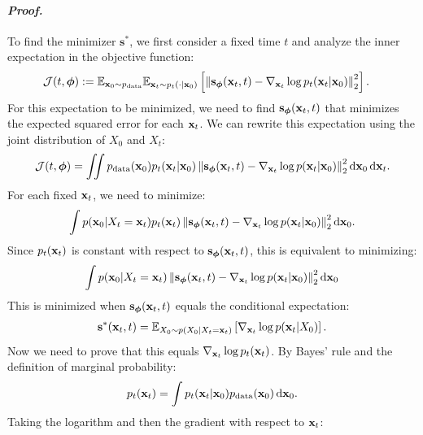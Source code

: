 \paragraph{\textit{Proof.}} To find the minimizer $\mathbf{s}^*$, we first consider a fixed time $t$ and analyze the inner expectation in the objective function:
\begin{align*}
\mathcal  J(t, \bm{\phi}) 
&:= \mathbb{E}_{{\mathbf{x}}_0 \sim p_{\text{data}}} 
\mathbb{E}_{{\mathbf{x}}_t \sim p_t(\cdot|{\mathbf{x}}_0)} 
\left[\left\| \mathbf{s}_{\bm{\phi}}({\mathbf{x}}_t, t) - \nabla_{{\mathbf{x}}_t} \log p_t({\mathbf{x}}_t|{\mathbf{x}}_0) \right\|_2^2 \right].
\end{align*}
For this expectation to be minimized, we need to find 
$\mathbf{s}_{\bm{\phi}}({\mathbf{x}}_t, t)$ 
that minimizes the expected squared error for each ${\mathbf{x}}_t$.
We can rewrite this expectation using the joint distribution of $X_0$ and $X_t$:
\begin{align*}
\mathcal J(t, \bm{\phi}) 
= \iint p_{\text{data}}({\mathbf{x}}_0) p_t({\mathbf{x}}_t |{\mathbf{x}}_0) 
\left\| \mathbf{s}_{\bm{\phi}}({\mathbf{x}}_t, t) - \nabla_{{\mathbf{x}}_t} \log p({\mathbf{x}}_t |  {\mathbf{x}}_0) \right\|_2^2 
 \mathop{}\!\mathrm{d}{\mathbf{x}}_0  \mathop{}\!\mathrm{d}{\mathbf{x}}_t.
\end{align*}
For each fixed ${\mathbf{x}}_t$, we need to minimize:
\begin{align*}
\int p({\mathbf{x}}_0 | X_t = {\mathbf{x}}_t) p_t( {\mathbf{x}}_t) 
\left\| \mathbf{s}_{\bm{\phi}}({\mathbf{x}}_t, t) - \nabla_{{\mathbf{x}}_t} \log p({\mathbf{x}}_t |  {\mathbf{x}}_0) \right\|_2^2 
 \mathop{}\!\mathrm{d}{\mathbf{x}}_0.
\end{align*}
Since $p_t({\mathbf{x}}_t)$ is constant with respect to 
$\mathbf{s}_{\bm{\phi}}({\mathbf{x}}_t, t)$, this is equivalent to minimizing:
\begin{align*}
\int p( {\mathbf{x}}_0 | X_t = {\mathbf{x}}_t) 
\left\| \mathbf{s}_{\bm{\phi}}({\mathbf{x}}_t, t) - \nabla_{{\mathbf{x}}_t} \log p({\mathbf{x}}_t |  {\mathbf{x}}_0) \right\|_2^2 
  \mathop{}\!\mathrm{d}{\mathbf{x}}_0
\end{align*}
This is minimized when $\mathbf{s}_{\bm{\phi}}({\mathbf{x}}_t, t)$ equals the conditional expectation:
\begin{align*}
\mathbf{s}^*({\mathbf{x}}_t, t) 
= \mathbb{E}_{X_0 \sim p(X_0 | X_t = {\mathbf{x}}_t)} 
\left[ \nabla_{{\mathbf{x}}_t} \log p({\mathbf{x}}_t | X_0) \right].
\end{align*}
Now we need to prove that this equals 
$\nabla_{{\mathbf{x}}_t} \log p_t({\mathbf{x}}_t)$. By Bayes' rule and the definition of marginal probability:
\begin{align*}
p_t({\mathbf{x}}_t) 
= \int p_t({\mathbf{x}}_t | {\mathbf{x}}_0) 
p_{\text{data}}({\mathbf{x}}_0)   \mathop{}\!\mathrm{d}{\mathbf{x}}_0.
\end{align*}
Taking the logarithm and then the gradient with respect to ${\mathbf{x}}_t$:

